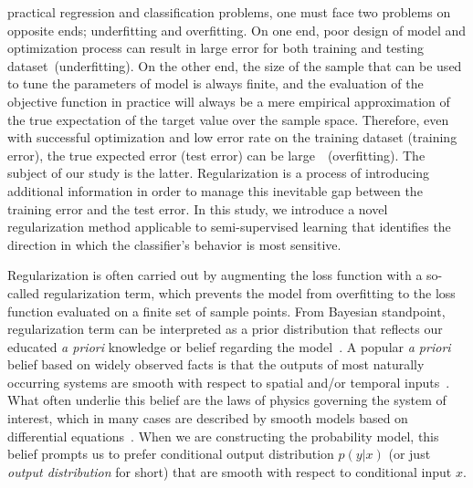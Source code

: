\documentclass[10pt,journal,compsoc]{IEEEtran}
\newcommand\iwrite[1]{\textcolor{red}{Meada: #1}}
\begin{document}
\maketitle
\IEEEpeerreviewmaketitle
{}
practical regression and classification problems, one must face two problems on opposite ends; underfitting and overfitting. 
On one end, poor design of model and optimization process can result in large error for both training and testing dataset~(underfitting). 
On the other end, the size of the sample that can be used to tune the parameters of model is always finite, and the evaluation of the objective function in practice will always be a mere empirical approximation of the true expectation of the target value over the sample space. Therefore, even with successful optimization and low error rate on the training dataset (training error), the true expected error (test error) can be large~\cite{akaike1998information, watanabe2009algebraic}~(overfitting).
The subject of our study is the latter.
Regularization is a process of introducing additional information in order to manage this inevitable gap between the training error and the test error.
In this study, we introduce a novel regularization method applicable to semi-supervised learning that identifies the direction in which the classifier's behavior is most sensitive. 

Regularization is often carried out by augmenting the loss function with a so-called regularization term, which prevents the model from overfitting to the loss function evaluated on a finite set of sample points.
From Bayesian standpoint, regularization term can be interpreted as a prior distribution that reflects our educated \textit{a priori} knowledge or belief regarding the model~\cite{Bishop:2006}.
A popular \textit{a priori} belief based on widely observed facts is that the outputs of most naturally occurring systems are smooth with respect to spatial and/or temporal inputs~\cite{wahba1990spline}. 
What often underlie this belief are the laws of physics governing the system of interest, which in many cases are described by smooth models based on differential equations~\cite{arnol2013mathematical}.
When we are constructing the probability model, this belief prompts us to prefer conditional output distribution $p(y|x)$ (or just \textit{output distribution} for short) that are smooth with respect to conditional input $x$. %
\end{document}
